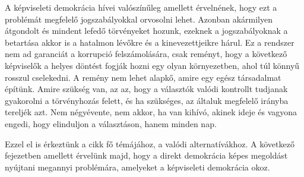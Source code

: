 A képviseleti demokrácia hívei valószínűleg amellett érvelnének, hogy ezt a problémát
megfelelő jogszabályokkal orvosolni lehet. Azonban akármilyen átgondolt és mindent lefedő
törvényeket hozunk, ezeknek a jogszabályoknak a betartása akkor is a hatalmon lévőkre
és a kinevezettjeikre hárul. Ez a rendszer nem ad garanciát a korrupció felszámolására,
csak reményt, hogy a következő képviselők a helyes döntést fogják hozni egy olyan
környezetben, ahol túl könnyű rosszul cselekedni. A remény nem lehet alapkő, amire egy
egész társadalmat építünk. Amire szükség van, az az, hogy a választók valódi kontrollt
tudjanak gyakorolni a törvényhozás felett, és ha szükséges, az általuk megfelelő irányba
tereljék azt. Nem négyévente, nem akkor, ha van kihívó, akinek ideje és vagyona engedi,
hogy elinduljon a választáson, hanem minden nap.

Ezzel el is érkeztünk a cikk fő témájához, a valódi alternatívákhoz. A következő
fejezetben amellett érvelünk majd, hogy a direkt demokrácia képes megoldást nyújtani
megannyi problémára, amelyeket a képviseleti demokrácia okoz.